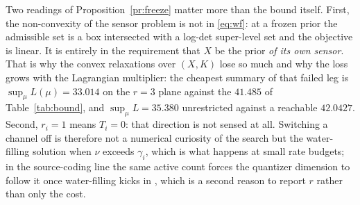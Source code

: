 Two readings of Proposition~\ref{pr:freeze} matter more than the bound itself.
First, the non-convexity of the sensor problem is not in \eqref{eq:wf}: at a
frozen prior the admissible set is a box intersected with a log-det
super-level set and the objective is linear. It is entirely in the requirement
that $X$ be the prior \emph{of its own sensor}. That is why the convex
relaxations over $(X,K)$ lose so much and why the loss grows with the
Lagrangian multiplier: the cheapest summary of that failed leg is
$\sup_\mu L(\mu)=33.014$ on the $r=3$ plane against the $41.485$ of
Table~\ref{tab:bound}, and $\sup_\mu L=35.380$ unrestricted against a
reachable $42.0427$. 
Second, $r_i=1$ means $T_i=0$: that direction is not sensed at all. Switching a
channel off is therefore not a numerical curiosity of the search but the
water-filling solution when $\nu$ exceeds $\gamma_i$, which is what happens at
small rate budgets; in the source-coding line the same active count forces the
quantizer dimension to follow it once water-filling kicks in
\cite{stavrou2018zerodelay}, which is a second reason to report $r$ rather than
only the cost.

